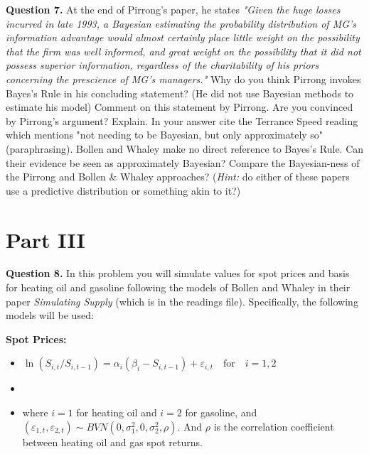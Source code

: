 \documentclass[12pt]{article}
\begin{document}
\textbf{Question 7.} At the end of Pirrong's paper, he states \textit{"Given the huge losses incurred in late 1993, a Bayesian estimating the probability distribution of 
MG's information advantage would almost certainly place little weight on the possibility that the firm was well informed, and great weight on the possibility that it did
not possess superior information, regardless of the charitability of his priors concerning the prescience of MG's managers."} Why do you think Pirrong invokes Bayes's Rule
in his concluding statement? (He did not use Bayesian methods to estimate his model) Comment on this statement by Pirrong. Are you convinced by Pirrong's argument? Explain.
In your answer cite the Terrance Speed reading which mentions "not needing to be Bayesian, but only approximately so" (paraphrasing). Bollen and Whaley make no direct reference to Bayes's
Rule. Can their evidence be seen as approximately Bayesian? Compare the Bayesian-ness of the Pirrong and Bollen \& Whaley approaches? (\textit{Hint:} do either of these papers
use a predictive distribution or something akin to it?)

\newpage

\section*{Part III}

\textbf{Question 8.} In this problem you will simulate values for spot prices and basis for heating oil
            and gasoline following the models of Bollen and Whaley in their paper \textit{Simulating Supply} 
			(which is in the readings file). Specifically, the following models will be used:

 \vspace{5mm}
 \textbf{Spot Prices:}
 \begin{itemize}
  \item $\ln{\left(S_{i,t} / S_{i,t-1}\right)} = \alpha_{i} (\beta_{i} - S_{i,t-1}) + \varepsilon_{i,t} \quad
	  \mbox{for} \quad i = 1, 2$
  \item[]
  \item where $i=1$ for heating oil and $i=2$ for gasoline, and $(\varepsilon_{1,t}, \varepsilon_{2,t}) \sim BVN(0,
	  \sigma_{1}^{2}, 0, \sigma_{2}^{2}, \rho)$. And $\rho$ is the correlation coefficient between heating oil and gas spot returns. 
 \end{itemize}
\end{document}
